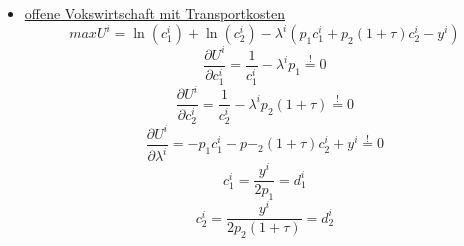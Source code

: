 \begin{itemize}
\item \underline{offene Vokswirtschaft mit Transportkosten}
\begin{equation} maxU^i=\ln(c^i_1)+\ln(c^i_2)-\lambda^i (p_1c^i_1+p_2(1+\tau)c^i_2-y^i)\end{equation}
\begin{equation}\frac{\partial U^i}{\partial c^i_1}=\frac{1}{c^i_1}-\lambda^i p_1\overset{!}{=}0\end{equation}
\begin{equation} \frac{\partial U^i}{\partial c^i_2}=\frac{1}{c^i_2}-\lambda^i p_2(1+\tau)\overset{!}{=}0\end{equation}
\begin{equation} \frac{\partial U^i}{\partial \lambda^i}=-p_1c^i_1-p-_2(1+\tau)c^i_2+y^i\overset{!}{=}0\end{equation}
\begin{equation} c^i_1=\frac{y^i}{2p_1}=d^i_1\end{equation}
\begin{equation} c^i_2=\frac{y^i}{2p_2(1+\tau)}=d^i_2\end{equation}
\end{itemize}



